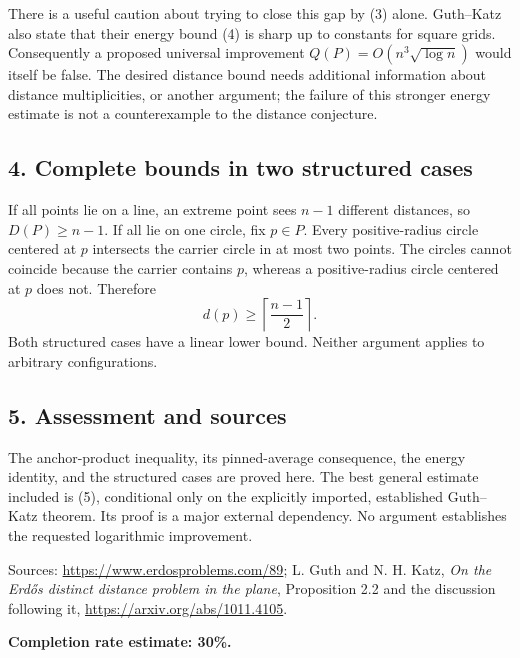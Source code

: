 There is a useful caution about trying to close this gap by (3) alone. Guth--Katz also state that their energy bound (4) is sharp up to constants for square grids. Consequently a proposed universal improvement $Q(P)=O(n^3\sqrt{\log n})$ would itself be false. The desired distance bound needs additional information about distance multiplicities, or another argument; the failure of this stronger energy estimate is not a counterexample to the distance conjecture.

\subsection*{4. Complete bounds in two structured cases}
If all points lie on a line, an extreme point sees $n-1$ different distances, so $D(P)\ge n-1$. If all lie on one circle, fix $p\in P$. Every positive-radius circle centered at $p$ intersects the carrier circle in at most two points. The circles cannot coincide because the carrier contains $p$, whereas a positive-radius circle centered at $p$ does not. Therefore
\[
 d(p)\ge\left\lceil\frac{n-1}{2}\right\rceil.
\]
Both structured cases have a linear lower bound. Neither argument applies to arbitrary configurations.

\subsection*{5. Assessment and sources}
The anchor-product inequality, its pinned-average consequence, the energy identity, and the structured cases are proved here. The best general estimate included is (5), conditional only on the explicitly imported, established Guth--Katz theorem. Its proof is a major external dependency. No argument establishes the requested logarithmic improvement.

Sources: \url{https://www.erdosproblems.com/89}; L. Guth and N. H. Katz, \emph{On the Erd\H{o}s distinct distance problem in the plane}, Proposition 2.2 and the discussion following it, \url{https://arxiv.org/abs/1011.4105}.

\textbf{Completion rate estimate: 30\%.}

